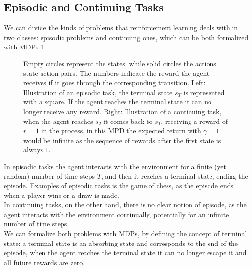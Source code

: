 \subsection{Episodic and Continuing Tasks}
We can divide the kinds of problems that reinforcement learning deals with in two classes: episodic problems and continuing ones, which can be both formalized with MDPs \ref{fig:episodic-continuing}.
\begin{figure}[H]
    \centering
    
    \caption{Empty circles represent the states, while solid circles the actions state-action pairs. The numbers indicate the reward the agent receives if it goes through the corresponding transition. Left: Illustration of an episodic task, the terminal state $s_T$ is represented with a square. If the agent reaches the terminal state it can no longer receive any reward. Right: Illustration of a continuing task, when the agent reaches $s_2$ it comes back to $s_1$, receiving a reward of $r=1$ in the process, in this MPD the expected return with $\gamma = 1$ would be infinite as the sequence of rewards after the first state is always $1$.}
    \label{fig:episodic-continuing}
\end{figure}
In episodic tasks the agent interacts with the environment for a finite (yet random) number of time steps $T$, and then it reaches a terminal state, ending the episode. Examples of episodic tasks is the game of chess, as the episode ends when a player wins or a draw is made.\\
In continuing tasks, on the other hand, there is no clear notion of episode, as the agent interacts with the environment continually, potentially for an infinite number of time steps.\\
We can formalize both problems with MDPs, by defining the concept of terminal state: a terminal state is an absorbing state and corresponds to the end of the episode, when the agent reaches the terminal state it can no longer escape it and all future rewards are zero.\\


